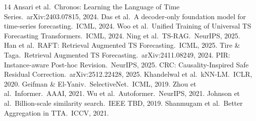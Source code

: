 \documentclass{article}
\begin{document}
{\small

\begin{thebibliography}{14}
 Ansari et al.\ Chronos: Learning the Language of Time Series.\ arXiv:2403.07815, 2024.
 Das et al.\ A decoder-only foundation model for time-series forecasting.\ ICML, 2024.
 Woo et al.\ Unified Training of Universal TS Forecasting Transformers.\ ICML, 2024.
 Ning et al.\ TS-RAG.\ NeurIPS, 2025.
 Han et al.\ RAFT: Retrieval Augmented TS Forecasting.\ ICML, 2025.
 Tire \& Taga.\ Retrieval Augmented TS Forecasting.\ arXiv:2411.08249, 2024.
 PIR: Instance-aware Post-hoc Revision.\ NeurIPS, 2025.
 CRC: Causality-Inspired Safe Residual Correction.\ arXiv:2512.22428, 2025.
 Khandelwal et al.\ kNN-LM.\ ICLR, 2020.
 Geifman \& El-Yaniv.\ SelectiveNet.\ ICML, 2019.
 Zhou et al.\ Informer.\ AAAI, 2021.
 Wu et al.\ Autoformer.\ NeurIPS, 2021.
 Johnson et al.\ Billion-scale similarity search.\ IEEE TBD, 2019.
 Shanmugam et al.\ Better Aggregation in TTA.\ ICCV, 2021.
\end{thebibliography}
}
\end{document}
